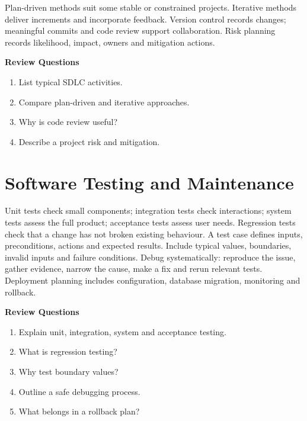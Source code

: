 \documentclass[11pt,openany,oneside]{book}
\newcommand{\reviewtitle}{\par\noindent\textbf{\color{Navy}Review Questions}\par}
\newcommand{\review}[1]{\par\smallskip\reviewtitle\begin{enumerate}[label=\arabic*.,leftmargin=1.8em,itemsep=1pt,topsep=2pt]\small #1\end{enumerate}\smallskip}
\begin{document}
Plan-driven methods suit some stable or constrained projects. Iterative methods deliver increments and incorporate feedback. Version control records changes; meaningful commits and code review support collaboration. Risk planning records likelihood, impact, owners and mitigation actions.
\review{\item List typical SDLC activities.\item Compare plan-driven and iterative approaches.\item Why is code review useful?\item Describe a project risk and mitigation.}
\chapter{Software Testing and Maintenance}
Unit tests check small components; integration tests check interactions; system tests assess the full product; acceptance tests assess user needs. Regression tests check that a change has not broken existing behaviour. A test case defines inputs, preconditions, actions and expected results. Include typical values, boundaries, invalid inputs and failure conditions.
Debug systematically: reproduce the issue, gather evidence, narrow the cause, make a fix and rerun relevant tests. Deployment planning includes configuration, database migration, monitoring and rollback.
\review{\item Explain unit, integration, system and acceptance testing.\item What is regression testing?\item Why test boundary values?\item Outline a safe debugging process.\item What belongs in a rollback plan?}
\end{document}
